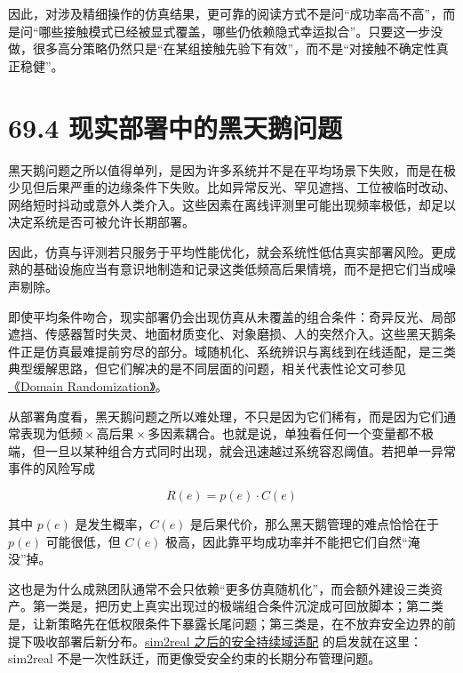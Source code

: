 因此，对涉及精细操作的仿真结果，更可靠的阅读方式不是问“成功率高不高”，而是问“哪些接触模式已经被显式覆盖，哪些仍依赖隐式幸运拟合”。只要这一步没做，很多高分策略仍然只是“在某组接触先验下有效”，而不是“对接触不确定性真正稳健”。

\section*{69.4 现实部署中的黑天鹅问题}


黑天鹅问题之所以值得单列，是因为许多系统并不是在平均场景下失败，而是在极少见但后果严重的边缘条件下失败。比如异常反光、罕见遮挡、工位被临时改动、网络短时抖动或意外人类介入。这些因素在离线评测里可能出现频率极低，却足以决定系统是否可被允许长期部署。

因此，仿真与评测若只服务于平均性能优化，就会系统性低估真实部署风险。更成熟的基础设施应当有意识地制造和记录这类低频高后果情境，而不是把它们当成噪声剔除。

即使平均条件吻合，现实部署仍会出现仿真从未覆盖的组合条件：奇异反光、局部遮挡、传感器暂时失灵、地面材质变化、对象磨损、人的突然介入。这些黑天鹅条件正是仿真最难提前穷尽的部分。域随机化、系统辨识与离线到在线适配，是三类典型缓解思路，但它们解决的是不同层面的问题，相关代表性论文可参见 \href{https://arxiv.org/abs/1703.06907}{《Domain Randomization》}。

从部署角度看，黑天鹅问题之所以难处理，不只是因为它们稀有，而是因为它们通常表现为\(低频 \times  高后果 \times  多因素耦合\)。也就是说，单独看任何一个变量都不极端，但一旦以某种组合方式同时出现，就会迅速越过系统容忍阈值。若把单一异常事件的风险写成

\begin{equation*}
R(e) = p(e) \cdot C(e)
\end{equation*}

其中 \(p(e)\) 是发生概率，\(C(e)\) 是后果代价，那么黑天鹅管理的难点恰恰在于 \(p(e)\) 可能很低，但 \(C(e)\) 极高，因此靠平均成功率并不能把它们自然“淹没”掉。

这也是为什么成熟团队通常不会只依赖“更多仿真随机化”，而会额外建设三类资产。第一类是\texttt{}，把历史上真实出现过的极端组合条件沉淀成可回放脚本；第二类是\texttt{}，让新策略先在低权限条件下暴露长尾问题；第三类是\texttt{}，在不放弃安全边界的前提下吸收部署后新分布。\href{https://arxiv.org/abs/2503.10949}{sim2real 之后的安全持续域适配} 的启发就在这里：sim2real 不是一次性跃迁，而更像受安全约束的长期分布管理问题。

